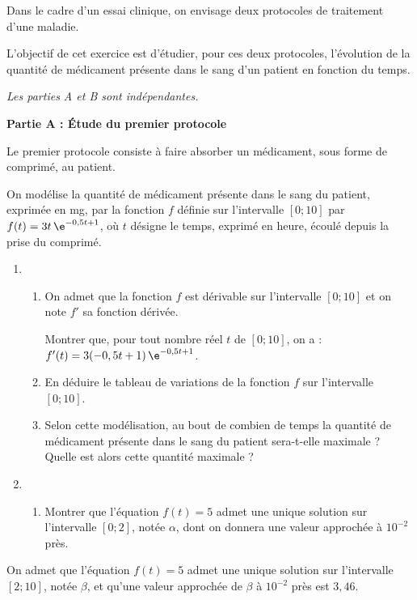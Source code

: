 Dans le cadre d’un essai clinique, on envisage deux protocoles de traitement d’une maladie.

L’objectif de cet exercice est d’étudier, pour ces deux protocoles, l’évolution de la quantité de médicament présente dans le sang d’un patient en fonction du temps.

\smallskip

\textit{Les parties A et B sont indépendantes.}

\medskip

\textbf{Partie A : Étude du premier protocole}

\medskip

Le premier protocole consiste à faire absorber un médicament, sous forme de comprimé, au patient.

On modélise la quantité de médicament présente dans le sang du patient, exprimée en mg, par la fonction $f$ définie sur l’intervalle $[0;10]$ par $f(t)=3t\,\e^{-0,5t+1}$, où $t$ désigne le temps, exprimé en heure, écoulé depuis la prise du comprimé. 

\begin{enumerate}
	\item 
	\begin{enumerate}
		\item On admet que la fonction $f$ est dérivable sur l’intervalle $[0;10]$ et on note $f'$ sa fonction dérivée.
		
		Montrer que, pour tout nombre réel $t$ de $[0;10]$, on a : $f'(t)=3(-0,5t+1)\,\e^{-0,5t+1}$.
		\item En déduire le tableau de variations de la fonction $f$ sur l’intervalle $[0;10]$.
		\item Selon cette modélisation, au bout de combien de temps la quantité de médicament présente dans le sang du patient sera-t-elle maximale ? Quelle est alors cette quantité maximale ?
	\end{enumerate}
	\item 
	\begin{enumerate}[series=mylist]
		\item Montrer que l’équation $f(t)=5$ admet une unique solution sur l’intervalle $[0;2]$, notée $\alpha$, dont on donnera une valeur approchée à $10^{-2}$ près.
	\end{enumerate}
\end{enumerate}

On admet que l’équation $f(t)=5$ admet une unique solution sur l’intervalle $[2;10]$, notée $\beta$, et qu’une valeur approchée de $\beta$ à $10^{-2}$ près est $3,46$.

